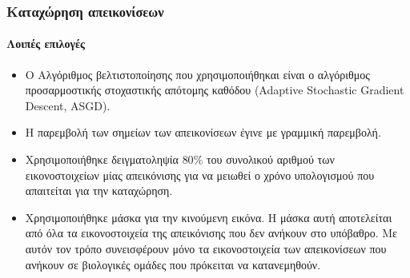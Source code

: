 \documentclass{beamer}
\begin{document}
\begin{frame}
\frametitle{Καταχώρηση απεικονίσεων}
\framesubtitle{Λοιπές επιλογές}

\begin{itemize}
    \item<1-> Ο Αλγόριθμος βελτιστοποίησης που χρησιμοποιήθηκαι είναι ο
        αλγόριθμος προσαρμοστικής στοχαστικής απότομης καθόδου (Adaptive
        Stochastic Gradient Descent, ASGD).
    \item<2-> Η παρεμβολή των σημείων των απεικονίσεων έγινε με γραμμική
        παρεμβολή.
    \item<3-> Χρησιμοποιήθηκε δειγματοληψία $80\%$ του συνολικού αριθμού των
        εικονοστοιχείων μίας απεικόνισης για να μειωθεί ο χρόνο υπολογισμού που
        απαιτείται για την καταχώρηση.
    \item<4-> Χρησιμοποιήθηκε μάσκα για την κινούμενη εικόνα. Η μάσκα αυτή
        αποτελείται από όλα τα εικονοστοιχεία της απεικόνισης που δεν ανήκουν
        στο υπόβαθρο. Με αυτόν τον τρόπο συνεισφέρουν μόνο τα εικονοστοιχεία των
        απεικονίσεων που ανήκουν σε βιολογικές ομάδες που πρόκειται να
        κατανεμηθούν.
\end{itemize}

\end{frame}
\end{document}
